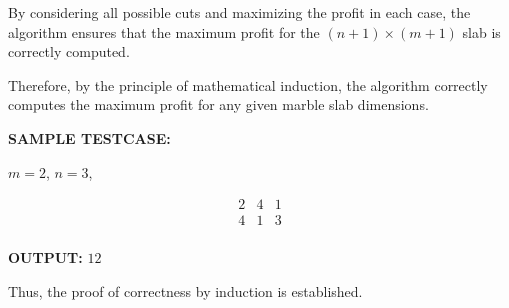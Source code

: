 \documentclass{article}
\begin{document}
    By considering all possible cuts and maximizing the profit in each case, the algorithm ensures that the maximum profit for the $(n+1) \times (m+1)$ slab is correctly computed.

    Therefore, by the principle of mathematical induction, the algorithm correctly computes the maximum profit for any given marble slab dimensions.

    \textbf{SAMPLE TESTCASE:}

    $m=2$, $n=3$, 

    \[
    \begin{array}{ccc}
    2 & 4 & 1 \\
    4 & 1 & 3 \\
    \end{array}
    \]

    \textbf{OUTPUT:} $12$

    Thus, the proof of correctness by induction is established.
\end{document}
